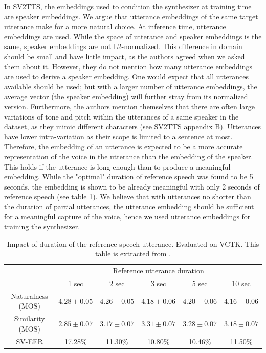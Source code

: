 \documentclass[a4paper, oneside, 12pt, english]{article}
\begin{document}
In SV2TTS, the embeddings used to condition the synthesizer at training time are speaker embeddings. We argue that utterance embeddings of the same target utterance make for a more natural choice. At inference time, utterance embeddings are used. While the space of utterance and speaker embeddings is the same, speaker embeddings are not L2-normalized. This difference in domain should be small and have little impact, as the authors agreed when we asked them about it. However, they do not mention how many utterance embeddings are used to derive a speaker embedding. One would expect that all utterances available should be used; but with a larger number of utterance embeddings, the average vector (the speaker embedding) will further stray from its normalized version. Furthermore, the authors mention themselves that there are often large variations of tone and pitch within the utterances of a same speaker in the dataset, as they mimic different characters (see SV2TTS appendix B). Utterances have lower intra-variation as their scope is limited to a sentence at most. Therefore, the embedding of an utterance is expected to be a more accurate representation of the voice in the utterance than the embedding of the speaker. This holds if the utterance is long enough than to produce a meaningful embedding. While the "optimal" duration of reference speech was found to be 5 seconds, the embedding is shown to be already meaningful with only 2 seconds of reference speech (see table \ref{reference_speech_duration}). We believe that with utterances no shorter than the duration of partial utterances, the utterance embedding should be sufficient for a meaningful capture of the voice, hence we used utterance embeddings for training the synthesizer.

\begin{table}[h]
	\begin{center}
		\begin{small}
			\begin{tabular}{cccccc}
				\toprule
				& \multicolumn{5}{c}{Reference utterance duration} \\
				& 1 sec & 2 sec & 3 sec & 5 sec & 10 sec \\
				\midrule
				Naturalness (MOS) & $4.28 \pm 0.05$ & 
				$4.26 \pm 0.05$ & $4.18 \pm 0.06$ & $4.20 \pm 0.06$ & $4.16 \pm 0.06$ \\
				Similarity (MOS) & $2.85 \pm 0.07$ & $3.17 \pm 0.07$ & $3.31 \pm 0.07$ & $3.28 \pm 0.07$ & $3.18 \pm 0.07$ \\
				SV-EER & 17.28\% & 11.30\% & 10.80\% & 10.46\% & 11.50\% \\
				\bottomrule
			\end{tabular}
		\end{small}
	\end{center}
	\caption{Impact of duration of the reference speech utterance. Evaluated on VCTK. This table is extracted from \citep{SV2TTS}.}
	\label{reference_speech_duration}
\end{table}
\end{document}
